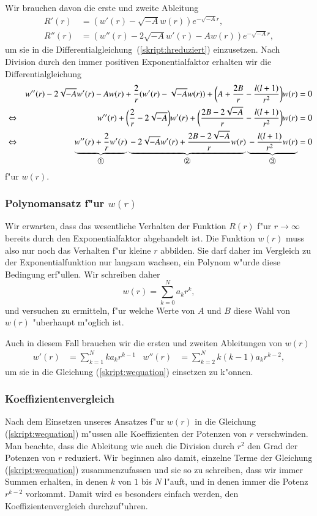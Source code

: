 Wir brauchen davon die erste und zweite Ableitung
\begin{align*}
R'(r)&=(w'(r)-\sqrt{-A}w(r))e^{-\sqrt{-A}r},
\\
R''(r)&=(w''(r)-2\sqrt{-A}w'(r)-Aw(r))e^{-\sqrt{-A}r},
\end{align*}
um sie in die Differentialgleichung~(\ref{skript:hreduziert}) einzusetzen.
Nach Division durch den immer positiven Exponentialfaktor
erhalten wir die Differentialgleichung
\begin{align}
&&
w''(r)-2\sqrt{-A}w'(r)-Aw(r)
+\frac2{r}(w'(r)-\sqrt{-A}w(r))
+\biggl(A+\frac{2B}r-\frac{l(l+1)}{r^2}\biggr)w(r)&=0
\notag
\\
&\Leftrightarrow&
w''(r)+\biggl(\frac{2}{r}-2\sqrt{-A}\biggr)w'(r)
+\biggl(\frac{2B-2\sqrt{-A}}{r}-\frac{l(l+1)}{r^2}\biggr)w(r)&=0
\notag
\\
&\Leftrightarrow&
\underbrace{
w''(r)+\frac{2}{r}w'(r)
}_{\text{\normalsize\ding{192}}}
\underbrace{\mathstrut-2\sqrt{-A}w'(r)
+\frac{2B-2\sqrt{-A}}{r} w(r)
}_{\text{\normalsize\ding{193}}}
\underbrace{\mathstrut-\frac{l(l+1)}{r^2}w(r)}_{\text{\normalsize\ding{194}}}&=0
\label{skript:wequation}
\end{align}
f"ur $w(r)$.

\subsubsection{Polynomansatz f"ur $w(r)$}
Wir erwarten, dass das wesentliche Verhalten der Funktion $R(r)$ 
f"ur $r\to\infty$ bereits durch den Exponentialfaktor abgehandelt ist.
Die Funktion $w(r)$ muss also nur noch das Verhalten f"ur kleine $r$
abbilden.
Sie darf daher im Vergleich zu der Exponentialfunktion nur langsam wachsen,
ein Polynom w"urde diese Bedingung erf"ullen.
Wir schreiben daher
\[
w(r)=\sum_{k=0}^N a_kr^k,
\]
und versuchen zu ermitteln, f"ur welche Werte von $A$ und $B$ diese
Wahl von $w(r)$ "uberhaupt m"oglich ist.

Auch in diesem Fall brauchen wir die ersten und zweiten Ableitungen von
$w(r)$
\begin{align*}
w'(r)&=\sum_{k=1}^Nka_kr^{k-1}
&
w''(r)&=\sum_{k=2}^Nk(k-1)a_kr^{k-2},
\end{align*}
um sie in die Gleichung (\ref{skript:wequation}) einsetzen zu k"onnen.

\subsubsection{Koeffizientenvergleich}
Nach dem Einsetzen unseres Ansatzes f"ur $w(r)$ in die Gleichung
(\ref{skript:wequation})
m"ussen alle Koeffizienten der Potenzen von $r$ verschwinden.
Man beachte, dass die Ableitung wie auch die Division durch $r^2$ den
Grad der Potenzen von $r$ reduziert.
Wir beginnen also damit, einzelne Terme der Gleichung
(\ref{skript:wequation}) zusammenzufassen und sie so zu schreiben,
dass wir immer Summen erhalten, in denen $k$ von $1$ bis $N$ l"auft, 
und in denen immer die Potenz $r^{k-2}$ vorkommt.
Damit wird es besonders einfach werden, den Koeffizientenvergleich
durchzuf"uhren.

